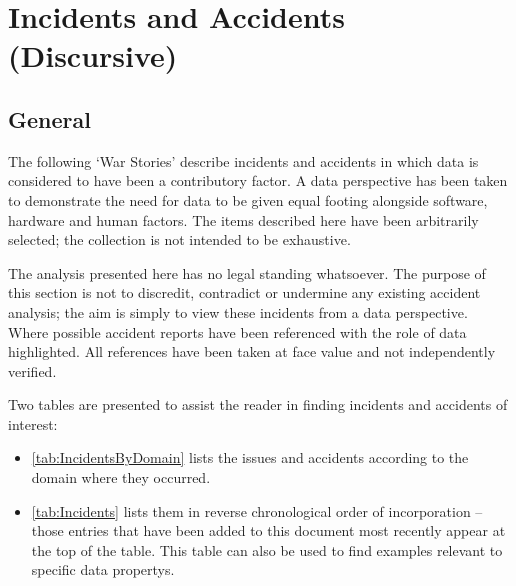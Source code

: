 %
%
\section{Incidents and Accidents (Discursive)} \label{bkm:accidents}


\subsection{General}
The following `War Stories' describe incidents and accidents in which data is considered to have been a contributory factor. A data perspective has been taken to demonstrate the need for data to be given equal footing alongside software, hardware and human factors. The items described here have been arbitrarily selected; the collection is not intended to be exhaustive.

 The analysis presented here has no legal standing whatsoever. The purpose of this section is not to discredit, contradict or undermine any existing accident analysis; the aim is simply to view these incidents from a data perspective. Where possible accident reports have been referenced with the role of data highlighted. All references have been taken at face value and not independently verified.

Two tables are presented to assist the reader in finding incidents and accidents of interest:
\begin{itemize}
\item \autoref{tab:IncidentsByDomain} lists the issues and accidents according to the domain where
  they occurred.
\item \autoref{tab:Incidents} lists them in reverse chronological order of incorporation -- those entries that have been added to this document most recently appear at the top of the table.
  This table can also be used to find examples relevant to specific \glspl{data property}.
\end{itemize}

